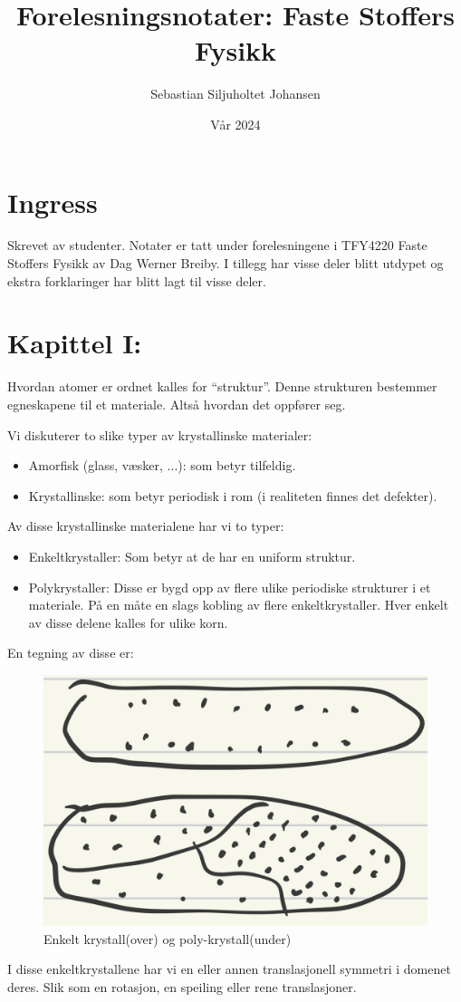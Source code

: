 \documentclass{article}
\title{Forelesningsnotater: Faste Stoffers Fysikk}
\author{Sebastian Siljuholtet Johansen }
\date{Vår 2024}
\begin{document}
\maketitle

\newpage
\section*{Ingress}
Skrevet av studenter. Notater er tatt under forelesningene i TFY4220 Faste Stoffers Fysikk av Dag Werner Breiby. I tillegg har visse deler blitt utdypet og ekstra forklaringer har blitt lagt til visse deler.
\newpage
\tableofcontents

\newpage
\section{Kapittel I: }
Hvordan atomer er ordnet kalles for \enquote{struktur}. Denne strukturen bestemmer egneskapene til et materiale. Altså hvordan det oppfører seg.

Vi diskuterer to slike typer av krystallinske materialer:
\begin{itemize}
    \item Amorfisk (glass, væsker, ...): som betyr tilfeldig.
    \item Krystallinske: som betyr periodisk i rom (i realiteten finnes det defekter).
\end{itemize}
Av disse krystallinske materialene har vi to typer:
\begin{itemize}
    \item Enkeltkrystaller: Som betyr at de har en uniform struktur.
    \item Polykrystaller: Disse er bygd opp av flere ulike periodiske strukturer i et materiale. På en måte en slags kobling av flere enkeltkrystaller. Hver enkelt av disse delene kalles for ulike korn. 
\end{itemize}
En tegning av disse er:
\begin{figure}[H]
    \centering
    \includegraphics[width=0.5\linewidth]{bilder/enkelt_poly_krystaller.png}
    \caption{Enkelt krystall(over) og poly-krystall(under)}
    \label{fig:enkelt_poly_krystaller}
\end{figure}
I disse enkeltkrystallene har vi en eller annen translasjonell symmetri i domenet deres. Slik som en rotasjon, en speiling eller rene translasjoner.
\end{document}
